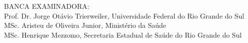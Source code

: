 \begin{folhadeaprovacao}
\begin{center}
 
    \vspace*{\fill}
    \hspace{.4\textwidth}
    \begin{minipage}{1.5\textwidth}
    BANCA EXAMINADORA:\\
    	Prof. Dr. Jorge Otávio Trierweiler, Universidade Federal do Rio Grande do Sul \\
        MSc. Aristeu de Oliveira Junior, Ministério da Saúde\\
   MSc. Henrique Mezzomo, Secretaria Estadual de Saúde do Rio Grande do Sul
    \end{minipage}%
    \begin{center}
    \vspace*{0.5cm}
       {\large\imprimirlocal}
       \par
       {\large\imprimirdata}
       \vspace*{1.2cm}
       \end{center}
\end{center}
  
\end{folhadeaprovacao}


